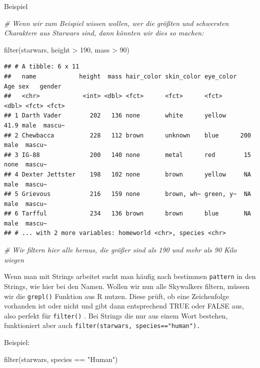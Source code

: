 \documentclass[
]{book}
\newenvironment{Shaded}{\begin{snugshade}}{\end{snugshade}}
\newcommand{\CommentTok}[1]{\textcolor[rgb]{0.56,0.35,0.01}{\textit{#1}}}
\newcommand{\DecValTok}[1]{\textcolor[rgb]{0.00,0.00,0.81}{#1}}
\newcommand{\FunctionTok}[1]{\textcolor[rgb]{0.00,0.00,0.00}{#1}}
\newcommand{\NormalTok}[1]{#1}
\newcommand{\SpecialCharTok}[1]{\textcolor[rgb]{0.00,0.00,0.00}{#1}}
\newcommand{\StringTok}[1]{\textcolor[rgb]{0.31,0.60,0.02}{#1}}
\theoremstyle{definition}
\theoremstyle{definition}
\theoremstyle{definition}
\theoremstyle{definition}
\theoremstyle{remark}
\begin{document}
Beispiel

\begin{Shaded}
\begin{Highlighting}[]
\CommentTok{\# Wenn wir zum Beispiel wissen wollen, wer die größten und schwersten Charaktere aus Starwars sind, dann könnten wir dies so machen:}

\FunctionTok{filter}\NormalTok{(starwars, height }\SpecialCharTok{\textgreater{}} \DecValTok{190}\NormalTok{, mass }\SpecialCharTok{\textgreater{}} \DecValTok{90}\NormalTok{)}
\end{Highlighting}
\end{Shaded}

\begin{verbatim}
## # A tibble: 6 x 11
##   name            height  mass hair_color skin_color eye_color   Age sex   gender
##   <chr>            <int> <dbl> <fct>      <fct>      <fct>     <dbl> <fct> <fct> 
## 1 Darth Vader        202   136 none       white      yellow     41.9 male  mascu~
## 2 Chewbacca          228   112 brown      unknown    blue      200   male  mascu~
## 3 IG-88              200   140 none       metal      red        15   none  mascu~
## 4 Dexter Jettster    198   102 none       brown      yellow     NA   male  mascu~
## 5 Grievous           216   159 none       brown, wh~ green, y~  NA   male  mascu~
## 6 Tarfful            234   136 brown      brown      blue       NA   male  mascu~
## # ... with 2 more variables: homeworld <chr>, species <chr>
\end{verbatim}

\begin{Shaded}
\begin{Highlighting}[]
\CommentTok{\# Wir filtern hier alle heraus, die größer sind als 190 und mehr als 90 Kilo wiegen}
\end{Highlighting}
\end{Shaded}

Wenn man mit Strings arbeitet sucht man häufig nach bestimmen \texttt{pattern} in den Strings, wie hier bei den Namen. Wollen wir nun alle Skywalkers filtern, müssen wir die \texttt{grepl()} Funktion aus R nutzen. Diese prüft, ob eine Zeichenfolge vorhanden ist oder nicht und gibt dann entsprechend TRUE oder FALSE aus, also perfekt für \texttt{filter()} . Bei Strings die nur aus einem Wort bestehen, funktioniert aber auch \texttt{filter(starwars,\ species=="human").}

Beispiel:

\begin{Shaded}
\begin{Highlighting}[]
\FunctionTok{filter}\NormalTok{(starwars, species }\SpecialCharTok{==} \StringTok{"Human"}\NormalTok{)}
\end{Highlighting}
\end{Shaded}
\end{document}
